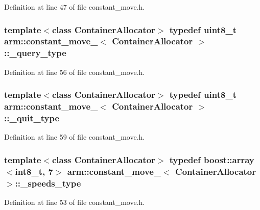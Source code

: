 \-Definition at line 47 of file constant\-\_\-move.\-h.

\subsubsection[{\-\_\-query\-\_\-type}]{\setlength{\rightskip}{0pt plus 5cm}template$<$class \-Container\-Allocator$>$ typedef uint8\-\_\-t {\bf arm\-::constant\-\_\-move\-\_\-}$<$ \-Container\-Allocator $>$\-::{\bf \-\_\-query\-\_\-type}}\label{structarm_1_1constant__move___a44c8c30deddc625f351ee6717cd65177}


\-Definition at line 56 of file constant\-\_\-move.\-h.

\subsubsection[{\-\_\-quit\-\_\-type}]{\setlength{\rightskip}{0pt plus 5cm}template$<$class \-Container\-Allocator$>$ typedef uint8\-\_\-t {\bf arm\-::constant\-\_\-move\-\_\-}$<$ \-Container\-Allocator $>$\-::{\bf \-\_\-quit\-\_\-type}}\label{structarm_1_1constant__move___a08049d0526a0845fd04c00cae40e3820}


\-Definition at line 59 of file constant\-\_\-move.\-h.

\subsubsection[{\-\_\-speeds\-\_\-type}]{\setlength{\rightskip}{0pt plus 5cm}template$<$class \-Container\-Allocator$>$ typedef boost\-::array$<$int8\-\_\-t, 7$>$ {\bf arm\-::constant\-\_\-move\-\_\-}$<$ \-Container\-Allocator $>$\-::{\bf \-\_\-speeds\-\_\-type}}\label{structarm_1_1constant__move___aa2e85046b4b5ffeb5054c51c85d087f7}


\-Definition at line 53 of file constant\-\_\-move.\-h.

